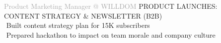 \begin{cvtable}
{\textcolor{darkgray}{%
    Product Marketing Manager
    \newline @
{W\scriptsize ILL}{D\scriptsize OM}
    }}%
{
}%
{%
{\scriptsize PRODUCT LAUNCHES:
CONTENT STRATEGY
\&
NEWSLETTER
(B2B)
} \\
    \textperiodcentered $ $ Built content strategy plan
    for 15K subscribers \\
    \textperiodcentered $ $ Prepared hackathon to impact on team morale and company culture \\
} 


\end{cvtable}
